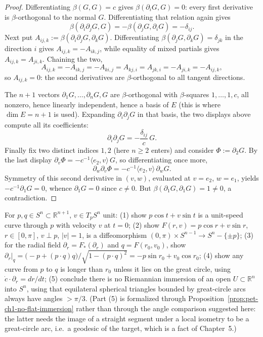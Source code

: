 \begin{proof}
  \leanok
  Differentiating $\beta(G,G)=c$ gives $\beta(\partial_iG,G)=0$: every first
  derivative is $\beta$-orthogonal to the normal $G$. Differentiating that
  relation again gives
  \[
    \beta(\partial_i\partial_jG,G)=-\beta(\partial_jG,\partial_iG)=-\delta_{ij}.
  \]
  Next put $A_{ij,k}:=\beta(\partial_i\partial_jG,\partial_kG)$. Differentiating
  $\beta(\partial_jG,\partial_kG)=\delta_{jk}$ in the direction $i$ gives
  $A_{ij,k}=-A_{ik,j}$, while equality of mixed partials gives
  $A_{ij,k}=A_{ji,k}$. Chaining the two,
  \[
    A_{ij,k}=-A_{ik,j}=-A_{ki,j}=A_{kj,i}=A_{jk,i}=-A_{ji,k}=-A_{ij,k},
  \]
  so $A_{ij,k}=0$: the second derivatives are $\beta$-orthogonal to all
  tangent directions.

  The $n+1$ vectors $\partial_1G,\dots,\partial_nG,G$ are $\beta$-orthogonal
  with $\beta$-squares $1,\dots,1,c$, all nonzero, hence linearly independent,
  hence a basis of $E$ (this is where $\dim E=n+1$ is used). Expanding
  $\partial_i\partial_jG$ in that basis, the two displays above compute all its
  coefficients:
  \[
    \partial_i\partial_jG=-\frac{\delta_{ij}}{c}\,G .
  \]
  Finally fix two distinct indices $1,2$ (here $n\ge2$ enters) and consider
  $\Phi:=\partial_2G$. By the last display $\partial_v\Phi=-c^{-1}\langle
  e_2,v\rangle\,G$, so differentiating once more,
  \[
    \partial_w\partial_v\Phi=-c^{-1}\langle e_2,v\rangle\,\partial_wG .
  \]
  Symmetry of this second derivative in $(v,w)$, evaluated at $v=e_2$, $w=e_1$,
  yields $-c^{-1}\partial_1G=0$, whence $\partial_1G=0$ since $c\ne0$. But
  $\beta(\partial_1G,\partial_1G)=1\ne0$, a contradiction.
\end{proof}

\begin{remark}
  \label{rem:pet-ch1-ex-20}
  \leanok
  For $p,q\in S^n\subset\mathbb{R}^{n+1}$, $v\in T_pS^n$ unit: (1) show $p\cos t+v\sin t$
  is a unit-speed curve through $p$ with velocity $v$ at $t=0$; (2) show
  $F(r,v)=p\cos r+v\sin r$, $r\in[0,\pi]$, $v\perp p$, $|v|=1$, is a
  diffeomorphism $(0,\pi)\times S^{n-1}\to S^n-\{\pm p\}$; (3) for the radial
  field $\partial_r=F_*(\partial_r)$ and $q=F(r_0,v_0)$, show
  $\partial_r|_q=\big(-p+(p\cdot q)q\big)/\sqrt{1-(p\cdot q)^2}=-p\sin r_0+v_0\cos r_0$;
  (4) show any curve from $p$ to $q$ is longer than $r_0$ unless it lies on the
  great circle, using $\dot c\cdot\partial_r=dr/dt$; (5) conclude there is no
  Riemannian immersion of an open $U\subset\mathbb{R}^n$ into $S^n$, using that
  equilateral spherical triangles bounded by great-circle arcs always have
  angles $>\pi/3$. (Part (5) is formalized through
  Proposition~\ref{prop:pet-ch1-no-flat-immersion} rather than through the
  angle comparison suggested here: the latter needs the image of a straight
  segment under a local isometry to be a great-circle arc, i.e.\ a geodesic of
  the target, which is a fact of Chapter~5.)
\end{remark}

